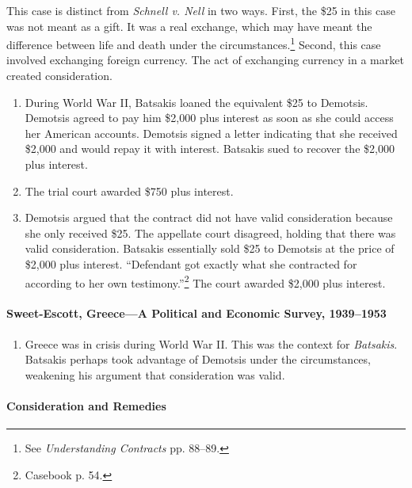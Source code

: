 This case is distinct from \emph{Schnell v. Nell} in two ways. First, the \$25 
in this case was not meant as a gift. It was a real exchange, which may have 
meant the difference between life and death under the 
circumstances.\footnote{See \emph{Understanding Contracts} pp. 88--89.} 
Second, this case involved exchanging foreign currency. The act of exchanging 
currency in a market created consideration.

\begin{enumerate}
    \item During World War II, Batsakis loaned the equivalent \$25 to 
    Demotsis. Demotsis agreed to pay him \$2,000 plus interest as soon as she 
    could access her American accounts. Demotsis signed a letter indicating 
    that she received \$2,000 and would repay it with interest. Batsakis sued 
    to recover the \$2,000 plus interest.
    \item The trial court awarded \$750 plus interest.
    \item Demotsis argued that the contract did not have valid consideration 
    because she only received \$25. 
    The appellate court disagreed, holding that there was valid consideration. 
    Batsakis essentially sold \$25 to Demotsis at the price of \$2,000 plus 
    interest. ``Defendant got exactly what she contracted for according to her 
    own testimony.''\footnote{Casebook p. 54.} The court awarded \$2,000 plus 
    interest.
\end{enumerate}

\paragraph{Sweet-Escott, Greece---A Political and Economic Survey, 
1939--1953}

\begin{enumerate}
    \item Greece was in crisis during World War II. This was the context for 
    \emph{Batsakis}. Batsakis perhaps took advantage of Demotsis under the 
    circumstances, weakening his argument that consideration was valid.
\end{enumerate}

\paragraph{Consideration and Remedies}

